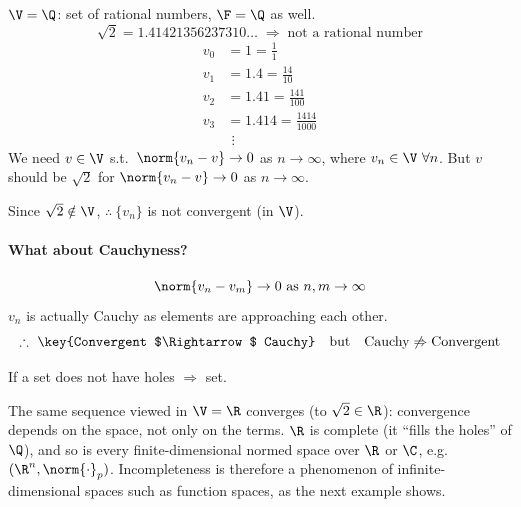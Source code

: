\begin{example}
$\V = \Q$: set of rational numbers, $\F = \Q$ as well.
\[
\sqrt{2} = 1.41421356237310\ldots \;\Rightarrow\; \text{not a rational number}
\]
\begin{align*}
v_0 &= 1 = \tfrac11\\
v_1 &= 1.4 = \tfrac{14}{10}\\
v_2 &= 1.41 = \tfrac{141}{100}\\
v_3 &= 1.414 = \tfrac{1414}{1000}\\
&\ \,\vdots
\end{align*}
We need $v\in\V$ s.t.\ $\norm{v_n - v}\to 0$ as $n\to\infty$, where $v_n \in\V\ \forall n$.
But $v$ should be $\sqrt2$ for $\norm{v_n - v}\to 0$ as $n\to\infty$.
\begin{center}
\end{center}
Since $\sqrt2\notin\V$, $\therefore\ \{v_n\}$ is not convergent (in $\V$).

\paragraph{What about Cauchyness?}
\[
\norm{v_n - v_m} \to 0 \text{ as } n,m\to\infty
\]
$v_n$ is actually Cauchy as elements are approaching each other.
\[
\therefore\ \text{\key{Convergent $\Rightarrow$ Cauchy}} \quad\text{but}\quad \text{Cauchy} \not\Rightarrow \text{Convergent}
\]
\end{example}
If a set does not have holes $\Rightarrow$  set.
\begin{insight}
The same sequence viewed in $\V=\R$ converges (to $\sqrt2\in\R$): convergence depends on the space, not only on the terms. $\R$ is complete (it ``fills the holes'' of $\Q$), and so is every finite-dimensional normed space over $\R$ or $\C$, e.g.\ $(\R^n,\norm{\cdot}_p)$. Incompleteness is therefore a phenomenon of infinite-dimensional spaces such as function spaces, as the next example shows.
\end{insight}

